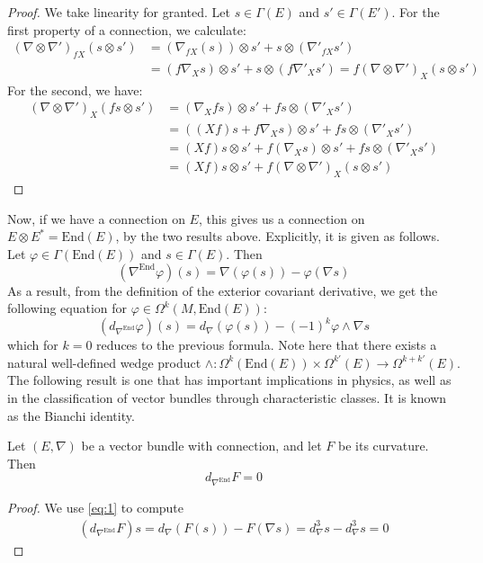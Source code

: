 \begin{proof}
  We take linearity for granted. Let $s\in\Gamma(E)$ and $s'\in\Gamma(E')$. For the first property of a connection, we calculate:
  \begin{align*}
    (\nabla\otimes\nabla')_{fX}(s\otimes s') &= (\nabla_{fX}(s))\otimes s'+s\otimes(\nabla'_{fX} s') \\
                                             &= (f\nabla_Xs)\otimes s'+s\otimes(f\nabla'_Xs')=f(\nabla\otimes\nabla')_X(s\otimes s')
  \end{align*}
  For the second, we have:
  \begin{align*}
    (\nabla\otimes\nabla')_X(fs\otimes s')&= (\nabla_Xfs)\otimes s'+fs\otimes(\nabla'_Xs') \\
                                          &= ((Xf)s+f\nabla_Xs)\otimes s'+fs\otimes(\nabla'_Xs') \\
                                          &= (Xf)s\otimes s'+f(\nabla_Xs)\otimes s'+fs\otimes(\nabla'_Xs') \\
                                          &= (Xf)s\otimes s'+f(\nabla\otimes\nabla')_X(s\otimes s')
  \end{align*}
\end{proof}
Now, if we have a connection on $E$, this gives us a connection on $E\otimes E^*=\text{End}(E)$, by the two results above. Explicitly, it is given as follows. Let $\varphi\in\Gamma(\text{End}(E))$ and $s\in\Gamma(E)$. Then
$$(\nabla^\text{End}\varphi)(s)=\nabla(\varphi(s))-\varphi(\nabla s)$$
As a result, from the definition of the exterior covariant derivative, we get the following equation for $\varphi\in\Omega^k(M,\text{End}(E))$:
\begin{equation}\label{eq:1}
  (d_{\nabla^\text{End}}\varphi)(s)=d_\nabla(\varphi(s))-(-1)^k\varphi\wedge\nabla s
\end{equation}
which for $k=0$ reduces to the previous formula.
Note here that there exists a natural well-defined wedge product $\wedge:\Omega^k(\text{End}(E))\times\Omega^{k'}(E)\to\Omega^{k+k'}(E)$.
The following result is one that has important implications in physics, as well as in the classification of vector bundles through characteristic classes. It is known as the Bianchi identity.
\begin{theorem}
  Let $(E,\nabla)$ be a vector bundle with connection, and let $F$ be its curvature. Then
  $$d_{\nabla^\text{End}}F=0$$
\end{theorem}
\begin{proof}
  We use \ref{eq:1} to compute
  \begin{align*}
    (d_{\nabla^\text{End}}F)s=d_\nabla(F(s))-F(\nabla s)=d_\nabla^3s-d_\nabla^3s=0
  \end{align*}
\end{proof}
